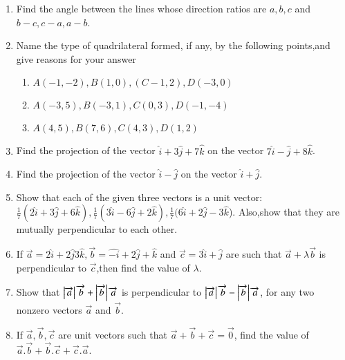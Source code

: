 \begin{enumerate}[label=\thesubsection.\arabic*,ref=\thesubsection.\theenumi]
\item
Find the angle between the lines whose direction ratios are $a,b,c$ and $b-c,c-a,a-b$.
\\
\solution

\item Name the type of quadrilateral formed, if any, by the following points,and give reasons for your answer
\begin{enumerate}
\item $A(-1,-2), B(1,0), (C-1,2), D(-3,0)$
\item $A(-3,5), B(-3,1), C(0,3), D(-1,-4)$
\item $A(4,5), B(7,6), C(4,3), D(1,2)$
\end{enumerate}
\solution
		
\item Find the projection of the vector $\hat{i}+3\hat{j}+7\hat{k}$ on the vector $7\hat{i}-\hat{j}+8\hat{k}$.
	\\
	\solution
		
\item Find the projection of the vector $\hat{i}-\hat{j}$ on the vector $\hat{i}+\hat{j}$.
	\\
\solution
		
\item Show that each of the given three vectors is a unit vector: 
 $\frac{1}{7}(2\hat{i}+3\hat{j}+6\hat{k}),\frac{1}{7}(3\hat{i}-6\hat{j}+2\hat{k}),\frac{1}{7}(6\hat{i}+2\hat{j}-3\hat{k}$).
Also,show that they are mutually perpendicular to each other.
	\\
	\solution
		
\item If $\overrightarrow {a}=2\hat{i}+2\hat{j}3\hat{k},\overrightarrow {b}=\hat{-i}+2\hat{j}+\hat{k}$ and $\overrightarrow {c}=3\hat{i}+\hat{j}$ are such that $\overrightarrow {a}+\lambda\overrightarrow {b}$ is perpendicular to $\overrightarrow {c}$,then find the value of $\lambda$.
	\\
		
\item Show that $\left\vert\overrightarrow {a}\right\vert\overrightarrow {b}+\left\vert\overrightarrow {b}\right\vert\overrightarrow {a}$ is perpendicular to $\left\vert\overrightarrow {a}\right\vert \overrightarrow {b}-\left\vert\overrightarrow {b}\right\vert \overrightarrow {a}$, for any two nonzero vectors $\overrightarrow {a}$ and $\overrightarrow {b}$.
	\\
	\solution
		
\item If $\overrightarrow {a},\overrightarrow {b},\overrightarrow {c}$ are unit vectors such that $\overrightarrow {a}+\overrightarrow {b}+\overrightarrow {c}=\overrightarrow {0}$, find the value of $\overrightarrow {a}.\overrightarrow {b}+\overrightarrow {b}.\overrightarrow {c}+\overrightarrow {c}.\overrightarrow {a}$.

\end{enumerate}
